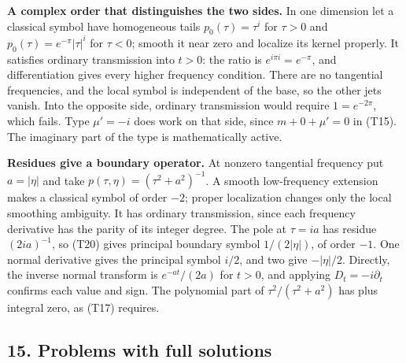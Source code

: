 \documentclass[
  11pt,
]{article}
\makeatletter
\let\ReaderOriginalAnchorStart\hyper@anchorstart
\let\ReaderOriginalAnchorEnd\hyper@anchorend
\let\ReaderPendingAliases\@empty
\def\ReaderArmAliases#1{\gdef\ReaderPendingAliases{#1}}
\def\hyper@anchorstart#1{\ReaderIfNativeAnchorTF{#1}{\ReaderPendingAliases\global\let\ReaderPendingAliases\@empty}{}\ReaderOriginalAnchorStart{#1}}
\makeatother
\begin{document}
\textbf{A complex order that distinguishes the two sides.} In one
dimension let a classical symbol have homogeneous tails
\(p_0(\tau)=\tau^i\) for \(\tau>0\) and \(p_0(\tau)=e^{-\pi}|\tau|^i\)
for \(\tau<0\); smooth it near zero and localize its kernel properly. It
satisfies ordinary transmission into \(t>0\): the ratio is
\(e^{i\pi i}=e^{-\pi}\), and differentiation gives every higher
frequency condition. There are no tangential frequencies, and the local
symbol is independent of the base, so the other jets vanish. Into the
opposite side, ordinary transmission would require \(1=e^{-2\pi}\),
which fails. Type \(\mu'=-i\) does work on that side, since
\(m+0+\mu'=0\) in (T15). The imaginary part of the type is
mathematically active.

\textbf{Residues give a boundary operator.} At nonzero tangential
frequency put \(a=|\eta|\) and take \(p(\tau,\eta)=(\tau^2+a^2)^{-1}\).
A smooth low-frequency extension makes a classical symbol of order
\(-2\); proper localization changes only the local smoothing ambiguity.
It has ordinary transmission, since each frequency derivative has the
parity of its integer degree. The pole at \(\tau=ia\) has residue
\((2ia)^{-1}\), so (T20) gives principal boundary symbol
\(1/(2|\eta|)\), of order \(-1\). One normal derivative gives the
principal symbol \(i/2\), and two give \(-|\eta|/2\). Directly, the
inverse normal transform is \(e^{-a t}/(2a)\) for \(t>0\), and applying
\(D_t=-i\partial_t\) confirms each value and sign. The polynomial part
of \(\tau^2/(\tau^2+a^2)\) has plus integral zero, as (T17) requires.

\ReaderArmAliases{\ReaderOriginalAnchorStart{AN03-CPS-001}\ReaderOriginalAnchorEnd\begingroup\expandafter\def\csname @currentHref\endcsname{AN03-CPS-001}\label{AN03-CPS-001}\endgroup\ReaderOriginalAnchorStart{an03-cps-001-problems-with-full-solutions}\ReaderOriginalAnchorEnd\begingroup\expandafter\def\csname @currentHref\endcsname{an03-cps-001-problems-with-full-solutions}\label{an03-cps-001-problems-with-full-solutions}\endgroup\ReaderOriginalAnchorStart{15-problems-with-full-solutions}\ReaderOriginalAnchorEnd\begingroup\expandafter\def\csname @currentHref\endcsname{15-problems-with-full-solutions}\label{15-problems-with-full-solutions}\endgroup\ReaderOriginalAnchorStart{problems-with-full-solutions}\ReaderOriginalAnchorEnd}
\subsection{15. Problems with full
solutions}\label{problems-with-full-solutions}
\end{document}
